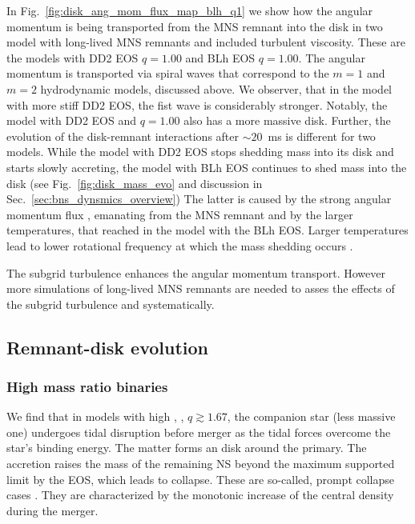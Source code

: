 In Fig.~\ref{fig:disk_ang_mom_flux_map_blh_q1} we show how the angular momentum is 
being transported from the \ac{MNS} remnant into the disk in two model with long-lived 
\ac{MNS} remnants and included turbulent viscosity.
%
These are the models with DD2 \ac{EOS} $q=1.00$ and BLh \ac{EOS} $q=1.00$.
%
The angular momentum is transported via spiral waves that correspond to the 
$m=1$ and $m=2$ hydrodynamic models, discussed above.
We observer, that in the model with more stiff DD2 \ac{EOS},
the fist wave is considerably stronger. Notably, the model with DD2 \ac{EOS} and $q=1.00$  
also has a more massive disk.
%
Further, the evolution of the disk-remnant interactions after $\sim20$~ms \pmerg{} 
is different for two models. While the model with DD2 \ac{EOS} stops 
shedding mass into its disk and starts slowly accreting, the model with BLh \ac{EOS} 
continues to shed mass into the disk (see Fig.~\ref{fig:disk_mass_evo} and discussion in
Sec.~\ref{sec:bns_dynsmics_overview})
%
The latter is caused by the strong angular momentum flux , 
emanating from the \ac{MNS} remnant and by the larger temperatures, 
that reached in the model with the BLh \ac{EOS}.
%
Larger temperatures lead to lower rotational frequency at which the mass 
shedding occurs \citep{Kaplan:2013wra}. 

The subgrid turbulence enhances the angular momentum transport. However more simulations of long-lived 
\ac{MNS} remnants are needed to asses the effects of the 
subgrid turbulence and \mr{} systematically. 


\subsection{Remnant-disk evolution}

\subsubsection*{High mass ratio binaries}

We find that in models with high \mr{}, \eg, $q\gtrsim1.67$, the companion star (less 
massive one) undergoes tidal disruption before merger as the tidal forces overcome the star's 
binding energy. The matter forms an disk around the primary.
The accretion raises the mass of the remaining \ac{NS} beyond the maximum supported limit by the 
\ac{EOS}, which leads to collapse. 
These are so-called, prompt collapse cases \citep{Radice:2020ddv,Bernuzzi:2020tgt,Bernuzzi:2020txg}.
They are characterized by the monotonic increase of the central density during the merger.

